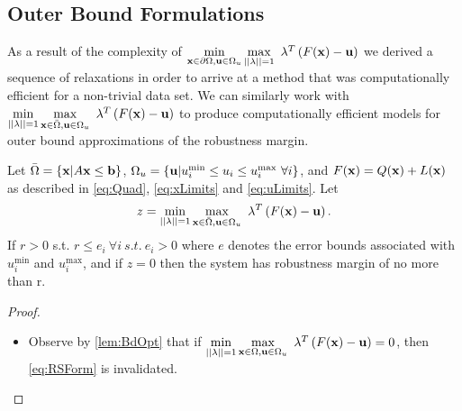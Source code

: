 \subsection{Outer Bound Formulations} \label{ssec:outbdform}

As a result of the complexity of $\min\limits_{\bold x\in \partial \Omega, \bold u\in\Omega_u}\max\limits_{||\bold \lambda||=1 }\ \bold\lambda^T\left(F(\bold x)-\bold u\right)$ we derived a sequence of relaxations in order to arrive at a method that was computationally efficient for a non-trivial data set. 
We can similarly work with $\min\limits_{||\bold{\lambda}||=1}\max\limits_{\bold x\in \bar{\Omega}, \bold u\in\Omega_u}\ \bold{\lambda}^T\left(F(\bold x)-\bold u\right)$ to produce computationally efficient models for outer bound approximations of the robustness margin. \\
\begin{thm}\label{thm:OPTfeasOut} 
Let $\bar{\Omega}=\{\bold x| A\bold x\leq \bold b\}$, $\Omega_{u}=\{\bold u| u^{\min}_i\leq u_i \leq u^{\max}_i \ \forall i \}$, and $F(\bold x)=Q(\bold x)+L(\bold x)$ as described in \eqref{eq:Quad}, \eqref{eq:xLimits} and \eqref{eq:uLimits}. 
Let
$$z = \min\limits_{||\bold{\lambda}||=1}\max\limits_{\bold x\in \bar{\Omega}, \bold u\in\Omega_u}\ \bold{\lambda}^T\left(F(\bold x)-\bold u\right).$$
If $r>0$ s.t. $r\leq e_i \ \forall i \ s.t. \ e_i>0$ where $e$ denotes the error bounds associated with $ u^{\min}_i$ and $ u^{\max}_i$, and if $z=0$ then the system has robustness margin of no more than r.

\begin{proof} \ \\
\begin{itemize}
\item[] Observe by \cref{lem:BdOpt} that if $\min\limits_{||\bold{\lambda}||=1}\max\limits_{\bold x\in \Omega, \bold u\in\Omega_u}\ \bold{\lambda}^T\left(F(\bold x)-\bold u\right)=0$, then \eqref{eq:RSForm} is invalidated.  

\end{itemize}
\end{proof}
\end{thm}

